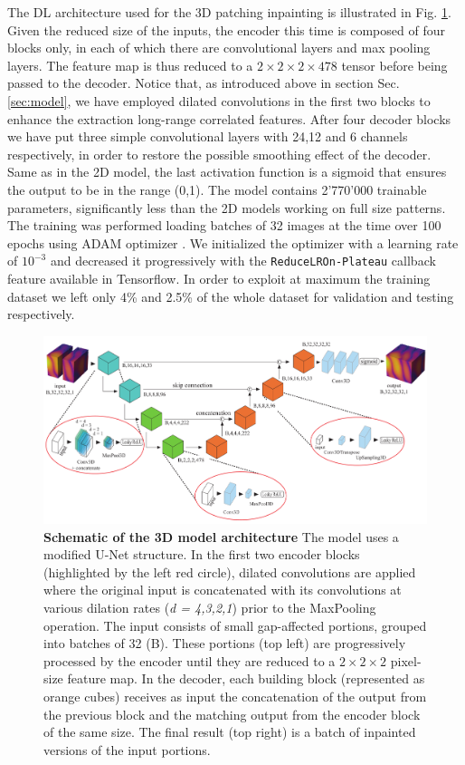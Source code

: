 The DL architecture used for the 3D patching inpainting is illustrated in Fig. \ref{fig:architecture3d}.  
Given the reduced size of the inputs, the encoder this time is composed of four blocks only, in each of which there
are convolutional layers and max pooling layers. The feature map is thus reduced to a $2\times2\times2\times478$ tensor 
before being passed to the decoder. Notice that, as introduced above in section Sec.\ref{sec:model}, we have employed
dilated convolutions in the first two blocks to enhance the extraction long-range correlated features. After four decoder
blocks we have put three simple convolutional layers with 24,12 and 6 channels respectively, in order to restore the possible
smoothing effect of the decoder. Same as in the 2D model, the last activation function is a sigmoid that ensures the output
to be in the range (0,1). 
The model contains 2'770'000 trainable parameters, significantly less than the 2D models working on full size patterns. 
\\
The training was performed loading batches of 32 images at the time over 100 epochs using ADAM optimizer \cite{ADAM}. 
We initialized the optimizer with a learning rate of $10^{-3}$ and decreased it progressively with the 
\texttt{ReduceLROn-Plateau} callback feature available in Tensorflow. In order to exploit at maximum the training 
dataset we left only 4\% and 2.5\% of the whole dataset for validation and testing respectively.  

\begin{figure}[h]
    \centering
    \includegraphics[width=\textwidth]{figures/Inpainting/Architecture_compressed.pdf}
    \caption{\textbf{Schematic of the 3D model architecture} The model uses a modified U-Net structure. 
    In the first two encoder blocks (highlighted by the left red circle), dilated convolutions are applied where the 
    original input is concatenated with its convolutions at various dilation rates (\textit{d = 4,3,2,1}) prior 
    to the MaxPooling operation. The input consists of small gap-affected portions, grouped into batches
     of 32 (B). These portions (top left) are progressively processed by the encoder until they are reduced to a 
     $ 2\times2\times2$ pixel-size feature map. In the decoder, each building block (represented as orange cubes) receives 
     as input the concatenation of the output from the previous block and the matching output from the encoder block 
     of the same size. The final result (top right) is a batch of inpainted versions of the input portions.}

    \label{fig:architecture3d}
\end{figure}

